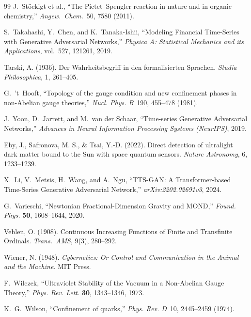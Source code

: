 \begin{thebibliography}{99}
 J.~St\"ockigt et al., ``The Pictet--Spengler reaction in nature and in organic chemistry,'' \emph{Angew.~Chem.}\ 50, 7580 (2011).

S.~Takahashi, Y.~Chen, and K.~Tanaka-Ishii,
``Modeling Financial Time-Series with Generative Adversarial Networks,''
\emph{Physica A: Statistical Mechanics and its Applications}, vol.~527, 121261, 2019.

 Tarski, A. (1936). Der Wahrheitsbegriff in den formalisierten Sprachen. \emph{Studia Philosophica}, 1, 261--405.

G.~'t~Hooft,
``Topology of the gauge condition and new confinement phases in non-Abelian gauge theories,''
\emph{Nucl. Phys. B}\ 190, 455--478 (1981).

J.~Yoon, D.~Jarrett, and M.~van der Schaar,
``Time-series Generative Adversarial Networks,''
\emph{Advances in Neural Information Processing Systems (NeurIPS)}, 2019.

 Eby, J., Safronova, M. S., \& Tsai, Y.-D. (2022). Direct detection of ultralight dark matter bound to the Sun with space quantum sensors. \emph{Nature Astronomy}, 6, 1233--1239.

X.~Li, V.~Metsis, H.~Wang, and A.~Ngu,
``TTS-GAN: A Transformer-based Time-Series Generative Adversarial Network,''
\emph{arXiv:2202.02691v3}, 2024.

G.~Varieschi, ``Newtonian Fractional-Dimension Gravity and MOND,'' \emph{Found. Phys.} \textbf{50}, 1608--1644, 2020.

 Veblen, O. (1908). Continuous Increasing Functions of Finite and Transfinite Ordinals. \emph{Trans.\ AMS}, 9(3), 280--292.

 Wiener, N. (1948). \emph{Cybernetics: Or Control and Communication in the Animal and the Machine}. MIT Press.

F.~Wilczek, ``Ultraviolet Stability of the Vacuum in a Non-Abelian Gauge Theory,'' \emph{Phys. Rev. Lett.} \textbf{30}, 1343--1346, 1973.

K.~G.~Wilson,
``Confinement of quarks,''
\emph{Phys. Rev. D}\ 10, 2445--2459 (1974).




\end{thebibliography}
